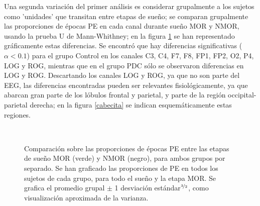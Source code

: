 \documentclass[12pt,a4paper]{mitthesis}
\begin{document}
Una segunda variaci\'on del primer an\'alisis es considerar grupalmente a los sujetos como 
'unidades' que transitan entre etapas de sue\~no; se comparan grupalmente las proporciones de 
\'epocas PE en cada canal durante sue\~no MOR y NMOR, usando la prueba U de Mann-Whithney; en 
la figura \ref{comparacion_verde} se han representado gr\'aficamente estas diferencias.
Se encontr\'o que hay diferencias significativas ($\alpha<0.1$) para el grupo Control en los 
canales C3, C4, F7, F8, FP1, FP2, O2, P4, LOG y ROG, mientras que en el grupo PDC s\'olo se
observaron diferencias en LOG y ROG.
Descartando los canales LOG y ROG, ya que no son parte del EEG, las diferencias encontradas pueden 
ser relevantes fisiol\'ogicamente, ya que abarcan gran parte de los l\'obulos frontal y parietal, 
y parte de la regi\'on occipital-parietal derecha; en la figura \ref{cabecita} se indican 
esquem\'aticamente estas regiones.

\begin{figure}
\centering
{}\\
\caption{Comparaci\'on sobre las proporciones de \'epocas PE entre las etapas de sue\~no MOR 
(verde) y NMOR (negro), para ambos grupos por separado. Se han graficado las proporciones de PE en 
todos los sujetos de cada grupo, para todo el sue\~no y la etapa MOR.
Se grafica el promedio grupal $\pm$ 1 desviaci\'on est\'andar$^{\nicefrac{3}{2}}$, como 
visualizaci\'on aproximada de la varianza.}
\label{comparacion_verde}
\end{figure}
\end{document}

